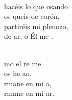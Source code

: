 \begin{cancion}[Amaos][Kairoi]
\jump\\
	hacéis lo que osando\\
	os queis de corón,\\
	partiréis mi plenozo,\\
	de ar, o Él me . \\\jump\\
	\begin{chorus}%
	mo el re me  \\
	 os he ao.\\
	rmane en mi a,\\
	rmane en mi ar.\\
	\end{chorus}%
	\jump\\
\end{cancion}%
